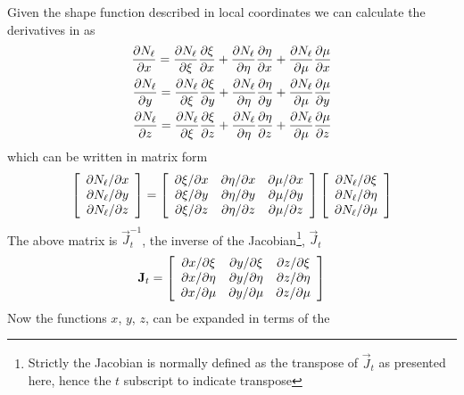 \documentclass[a4paper]{article}
\begin{document}
Given the shape function described in local coordinates we can
calculate the derivatives in  as
\begin{eqnarray}
  \frac{\partial N_\ell}{\partial x}=\frac{\partial N_\ell}{\partial\xi}\frac{\partial\xi}{\partial x}
+\frac{\partial N_\ell}{\partial\eta}\frac{\partial\eta}{\partial x}
+\frac{\partial N_\ell}{\partial\mu}\frac{\partial\mu}{\partial x}\\
  \frac{\partial N_\ell}{\partial y}=\frac{\partial N_\ell}{\partial\xi}\frac{\partial\xi}{\partial y}
+\frac{\partial N_\ell}{\partial\eta}\frac{\partial\eta}{\partial y}
+\frac{\partial N_\ell}{\partial\mu}\frac{\partial\mu}{\partial y}\\
  \frac{\partial N_\ell}{\partial z}=\frac{\partial N_\ell}{\partial\xi}\frac{\partial\xi}{\partial z}
+\frac{\partial N_\ell}{\partial\eta}\frac{\partial\eta}{\partial z}
+\frac{\partial N_\ell}{\partial\mu}\frac{\partial\mu}{\partial z}
\end{eqnarray}
which can be written in matrix form
\begin{equation}
  \left[\begin{array}{c}
    {\partial N_\ell}/{\partial x}\\
    {\partial N_\ell}/{\partial y}\\
    {\partial N_\ell}/{\partial z}
  \end{array}\right]
=
\left[\begin{array}{ccc}
 {\partial\xi}/{\partial x} & {\partial\eta}/{\partial x} & {\partial\mu}/{\partial x} \\
 {\partial\xi}/{\partial y} & {\partial\eta}/{\partial y} & {\partial\mu}/{\partial y} \\
 {\partial\xi}/{\partial z} & {\partial\eta}/{\partial z} & {\partial\mu}/{\partial z} 
\end{array}\right]
\left[\begin{array}{c}
  {\partial N_\ell}/{\partial\xi}\\
  {\partial N_\ell}/{\partial\eta}\\
  {\partial N_\ell}/{\partial\mu}
\end{array}\right]
\label{dN}
\end{equation}
The above matrix is $\vec J_t^{-1}$, the inverse of the
Jacobian\footnote{Strictly the Jacobian is normally defined as the
transpose of $\vec J_t$ as presented here, hence the $t$ subscript to
indicate transpose}, $\vec J_t$
\begin{equation}
  \mathbf{J}_t=
  \left[  \begin{array}{ccc}
    \partial x/\partial\xi & \partial y/\partial\xi & \partial z/\partial\xi\\
    \partial x/\partial\eta & \partial y/\partial\eta & \partial z/\partial\eta\\
    \partial x/\partial\mu & \partial y/\partial\mu & \partial z/\partial\mu\\
  \end{array}\right]
\end{equation}
Now the functions $x$, $y$, $z$, can be expanded in terms of the
\end{document}
